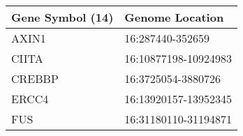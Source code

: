 \begin{tabular}{ll}
\toprule
Gene Symbol (14) &      Genome Location \\
\midrule
           AXIN1 &     16:287440-352659 \\
           CIITA & 16:10877198-10924983 \\
          CREBBP &   16:3725054-3880726 \\
           ERCC4 & 16:13920157-13952345 \\
             FUS & 16:31180110-31194871 \\
\bottomrule
\end{tabular}
